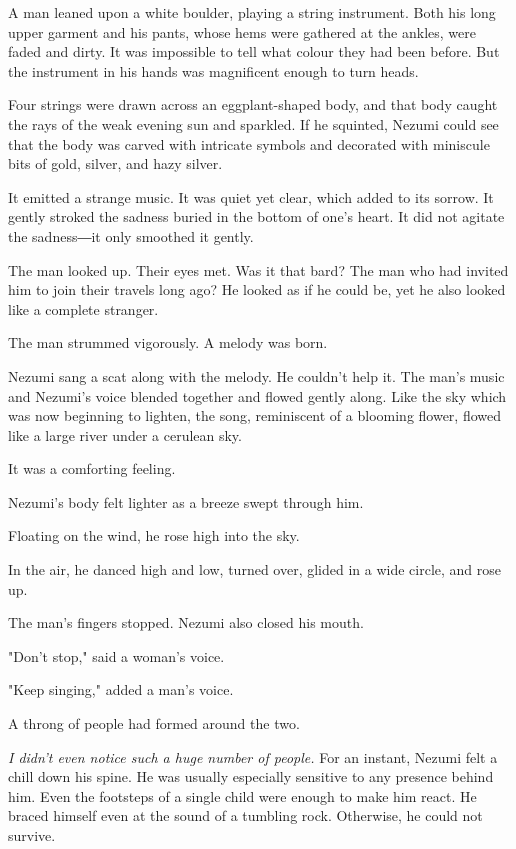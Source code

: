 A man leaned upon a white boulder, playing a string instrument. Both his
long upper garment and his pants, whose hems were gathered at the
ankles, were faded and dirty. It was impossible to tell what colour they
had been before. But the instrument in his hands was magnificent enough
to turn heads.

Four strings were drawn across an eggplant-shaped body, and that body
caught the rays of the weak evening sun and sparkled. If he squinted,
Nezumi could see that the body was carved with intricate symbols and
decorated with miniscule bits of gold, silver, and hazy silver.

It emitted a strange music. It was quiet yet clear, which added to its
sorrow. It gently stroked the sadness buried in the bottom of one's
heart. It did not agitate the sadness―it only smoothed it gently.

The man looked up. Their eyes met. Was it that bard? The man who had
invited him to join their travels long ago? He looked as if he could be,
yet he also looked like a complete stranger.

The man strummed vigorously. A melody was born.

Nezumi sang a scat along with the melody. He couldn't help it. The man's
music and Nezumi's voice blended together and flowed gently along. Like
the sky which was now beginning to lighten, the song, reminiscent of a
blooming flower, flowed like a large river under a cerulean sky.

It was a comforting feeling.

Nezumi's body felt lighter as a breeze swept through him.~

Floating on the wind, he rose high into the sky.

In the air, he danced high and low, turned over, glided in a wide
circle, and rose up.

The man's fingers stopped. Nezumi also closed his mouth.

"Don't stop," said a woman's voice.

"Keep singing," added a man's voice.

A throng of people had formed around the two.

\emph{I didn't even notice such a huge number of people.} For an instant,
Nezumi felt a chill down his spine. He was usually especially sensitive
to any presence behind him. Even the footsteps of a single child were
enough to make him react. He braced himself even at the sound of a
tumbling rock. Otherwise, he could not survive.

